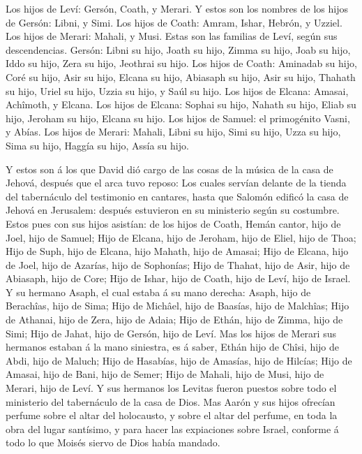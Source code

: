  Los hijos de Leví: Gersón, Coath, y Merari. 
Y estos son los nombres de los hijos de Gersón: Libni, y Simi.
 Los hijos de Coath: Amram, Ishar, Hebrón, y Uzziel.
 Los hijos de Merari: Mahali, y Musi. Estas son las
familias de Leví, según sus descendencias.  Gersón: Libni
su hijo, Joath su hijo, Zimma su hijo,  Joab su hijo, Iddo
su hijo, Zera su hijo, Jeothrai su hijo.  Los hijos de
Coath: Aminadab su hijo, Coré su hijo, Asir su hijo, 
Elcana su hijo, Abiasaph su hijo, Asir su hijo,  Thahath su
hijo, Uriel su hijo, Uzzia su hijo, y Saúl su hijo.  Los
hijos de Elcana: Amasai, Achîmoth, y Elcana.  Los hijos de
Elcana: Sophai su hijo, Nahath su hijo,  Eliab su hijo,
Jeroham su hijo, Elcana su hijo.  Los hijos de Samuel: el
primogénito Vasni, y Abías.  Los hijos de Merari: Mahali,
Libni su hijo, Simi su hijo, Uzza su hijo,  Sima su hijo,
Haggía su hijo, Assía su hijo.

 Y estos son á los que David dió cargo de las cosas de la
música de la casa de Jehová, después que el arca tuvo reposo:
 Los cuales servían delante de la tienda del tabernáculo
del testimonio en cantares, hasta que Salomón edificó la casa de Jehová
en Jerusalem: después estuvieron en su ministerio según su costumbre.
 Estos pues con sus hijos asistían: de los hijos de Coath,
Hemán cantor, hijo de Joel, hijo de Samuel;  Hijo de
Elcana, hijo de Jeroham, hijo de Eliel, hijo de Thoa;  Hijo
de Suph, hijo de Elcana, hijo Mahath, hijo de Amasai;  Hijo
de Elcana, hijo de Joel, hijo de Azarías, hijo de Sophonías;
 Hijo de Thahat, hijo de Asir, hijo de Abiasaph, hijo de
Core;  Hijo de Ishar, hijo de Coath, hijo de Leví, hijo de
Israel.  Y su hermano Asaph, el cual estaba á su mano
derecha: Asaph, hijo de Berachîas, hijo de Sima;  Hijo de
Michâel, hijo de Baasías, hijo de Malchîas;  Hijo de
Athanai, hijo de Zera, hijo de Adaia;  Hijo de Ethán, hijo
de Zimma, hijo de Simi;  Hijo de Jahat, hijo de Gersón,
hijo de Leví.  Mas los hijos de Merari sus hermanos estaban
á la mano siniestra, es á saber, Ethán hijo de Chîsi, hijo de Abdi, hijo
de Maluch;  Hijo de Hasabías, hijo de Amasías, hijo de
Hilcías;  Hijo de Amasai, hijo de Bani, hijo de Semer;
 Hijo de Mahali, hijo de Musi, hijo de Merari, hijo de
Leví.  Y sus hermanos los Levitas fueron puestos sobre todo
el ministerio del tabernáculo de la casa de Dios.  Mas
Aarón y sus hijos ofrecían perfume sobre el altar del holocausto, y
sobre el altar del perfume, en toda la obra del lugar santísimo, y para
hacer las expiaciones sobre Israel, conforme á todo lo que Moisés siervo
de Dios había mandado.

